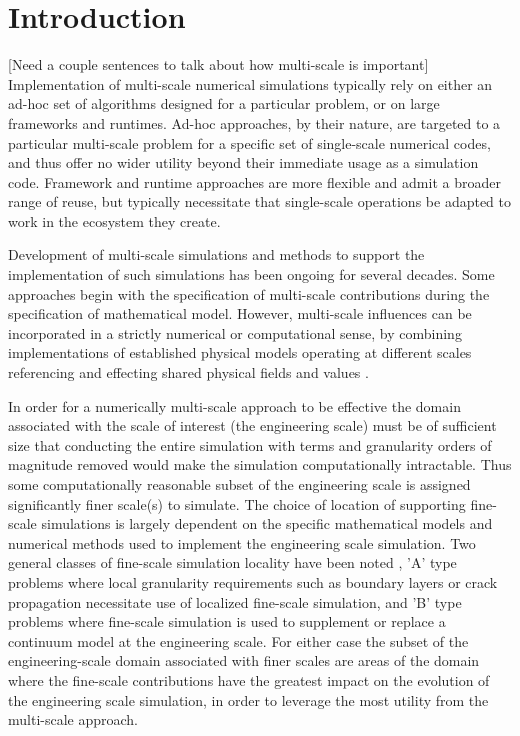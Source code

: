 \documentclass[11pt]{article}
\begin{document}
\maketitle

\begin{abstract}
\end{abstract}

\section{Introduction}\label{introduction}
[Need a couple sentences to talk about how multi-scale is important]
Implementation of multi-scale numerical simulations typically rely on either an ad-hoc set of algorithms designed for a particular problem, or on large frameworks and runtimes. 
Ad-hoc approaches, by their nature, are targeted to a particular multi-scale problem for a specific set of single-scale numerical codes, and thus offer no wider utility beyond their immediate usage as a simulation code.
Framework and runtime approaches are more flexible and admit a broader range of reuse, but typically necessitate that single-scale operations be adapted to work in the ecosystem they create.

Development of multi-scale simulations and methods to support the implementation of such simulations has been ongoing for several decades. 
Some approaches begin with the specification of multi-scale contributions during the specification of mathematical model.
However, multi-scale influences can be incorporated in a strictly numerical or computational sense, by combining implementations of established physical models operating at different scales referencing and effecting shared physical fields and values \cite{shenoy97} \cite{weinan2003heterogenous}. 

In order for a numerically multi-scale approach to be effective the domain associated with the scale of interest (the engineering scale) must be of sufficient size that conducting the entire simulation with terms and granularity orders of magnitude removed would make the simulation computationally intractable.
Thus some computationally reasonable subset of the engineering scale is assigned significantly finer scale(s) to simulate. 
The choice of location of supporting fine-scale simulations is largely dependent on the specific mathematical models and numerical methods used to implement the engineering scale simulation.
Two general classes of fine-scale simulation locality have been noted \cite{weinan2011principles}, 'A' type problems where local granularity requirements such as boundary layers or crack propagation necessitate use of localized fine-scale simulation, and 'B' type problems where fine-scale simulation is used to supplement or replace a continuum model at the engineering scale.
For either case the subset of the engineering-scale domain associated with finer scales are areas of the domain where the fine-scale contributions have the greatest impact on the evolution of the engineering scale simulation, in order to leverage the most utility from the multi-scale approach.
\end{document}
